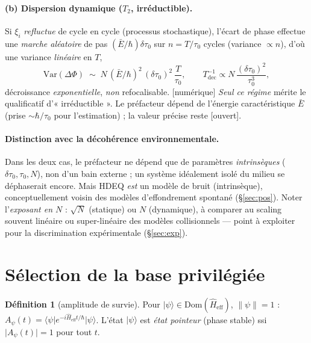 \documentclass[11pt,a4paper]{article}
\newcommand{\ket}[1]{\lvert #1\rangle}
\newcommand{\bra}[1]{\langle #1\rvert}
\newcommand{\Heff}{\hat{H}_{\mathrm{eff}}}
\newcommand{\statut}[1]{{\footnotesize\textsf{[#1]}}}
\theoremstyle{plain}
\theoremstyle{definition}
\newtheorem{definition}{D\'efinition}
\theoremstyle{remark}
\begin{document}
\paragraph{(b) Dispersion dynamique ($T_2$, irr\'eductible).} Si $\xi_i$ \emph{refluctue}
de cycle en cycle (processus stochastique), l'\'ecart de phase effectue une \emph{marche al\'eatoire} de pas $(\bar E/\hbar)\delta\tau_0$ sur $n=T/\tau_0$ cycles (variance $\propto n$), d'o\`u une variance \emph{lin\'eaire} en
$T$,
\[
\mathrm{Var}(\Delta\Phi)\;\sim\; N\,(\bar E/\hbar)^2\,(\delta\tau_0)^2\,\frac{T}{\tau_0},
\qquad
T_{\mathrm{dec}}^{-1}\propto N\,\frac{(\delta\tau_0)^2}{\tau_0^3},
\]
d\'ecroissance \emph{exponentielle}, \emph{non} refocalisable. \statut{num\'erique}
\emph{Seul ce r\'egime} m\'erite le qualificatif d'« irr\'eductible ». Le pr\'efacteur
d\'epend de l'\'energie caract\'eristique $\bar E$ (prise $\sim\hbar/\tau_0$ pour
l'estimation) ; la valeur pr\'ecise reste \statut{ouvert}.

\paragraph{Distinction avec la d\'ecoh\'erence environnementale.} Dans les deux cas, le
pr\'efacteur ne d\'epend que de param\`etres \emph{intrins\`eques} ($\delta\tau_0,\tau_0,N$),
non d'un bain externe ; un syst\`eme id\'ealement isol\'e du milieu se d\'ephaserait encore.
Mais HDEQ \emph{est} un mod\`ele de bruit (intrins\`eque), conceptuellement voisin des
mod\`eles d'effondrement spontan\'e (\S\ref{sec:pos}). Noter l'\emph{exposant en $N$} :
$\sqrt N$ (statique) ou $N$ (dynamique), \`a comparer au scaling souvent lin\'eaire ou
super-lin\'eaire des mod\`eles collisionnels --- point \`a exploiter pour la
discrimination exp\'erimentale (\S\ref{sec:exp}).

\section{S\'election de la base privil\'egi\'ee}\label{sec:base}

\begin{definition}[amplitude de survie]
Pour $\ket{\psi}\in\mathrm{Dom}(\Heff)$, $\lVert\psi\rVert=1$ :
$A_\psi(t)=\bra{\psi}e^{-i\Heff t/\hbar}\ket{\psi}$. L'\'etat $\ket{\psi}$ est
\emph{\'etat pointeur} (phase stable) ssi $\lvert A_\psi(t)\rvert=1$ pour tout $t$.
\end{definition}
\end{document}
